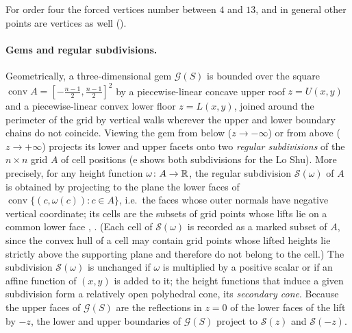 For order four the forced vertices number between $4$ and $13$, and in general other points are vertices as well ().

\paragraph{Gems and regular subdivisions.}
\label{sec:subdivisions}
Geometrically, a three-dimensional gem $\mathcal G(S)$ is bounded over the square $\operatorname{conv}A=[-\frac{n-1}2,\frac{n-1}2]^2$ by a piecewise-linear concave upper roof $z=U(x,y)$ and a piecewise-linear convex lower floor $z=L(x,y)$, joined around the perimeter of the grid by vertical walls wherever the upper and lower boundary chains do not coincide.
Viewing the gem from below ($z\to-\infty$) or from above ($z\to+\infty$) projects its lower and upper facets onto two \emph{regular subdivisions} of the $n\times n$ grid $A$ of cell positions (e shows both subdivisions for the Lo Shu).
More precisely, for any height function $\omega\colon A\to\mathbb{R}$, the regular subdivision $\mathcal S(\omega)$ of $A$ is obtained by projecting to the plane the lower faces of $\operatorname{conv}\{(c,\omega(c)):c\in A\}$, i.e.\ the faces whose outer normals have negative vertical coordinate; its cells are the subsets of grid points whose lifts lie on a common lower face \cite[Ch.~2]{deloera2010triangulations}, \cite[Ch.~7]{gelfand1994discriminants}.
(Each cell of $\mathcal S(\omega)$ is recorded as a marked subset of $A$, since the convex hull of a cell may contain grid points whose lifted heights lie strictly above the supporting plane and therefore do not belong to the cell.)
The subdivision $\mathcal S(\omega)$ is unchanged if $\omega$ is multiplied by a positive scalar or if an affine function of $(x,y)$ is added to it; the height functions that induce a given subdivision form a relatively open polyhedral cone, its \emph{secondary cone}.
Because the upper faces of $\mathcal G(S)$ are the reflections in $z=0$ of the lower faces of the lift by $-z$, the lower and upper boundaries of $\mathcal G(S)$ project to $\mathcal S(z)$ and $\mathcal S(-z)$.

